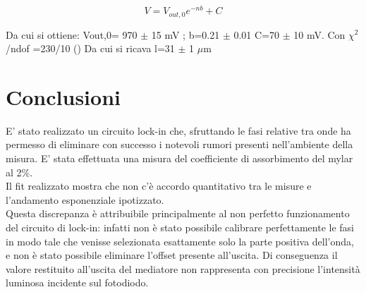 \begin{equation}
V=V_{out,0}e^{-nb} + C
\end{equation}

Da cui si ottiene:
V{out,0}= 970 $\pm$ 15 mV ;  b=0.21 $\pm$ 0.01  C=70 $\pm$ 10 mV. Con $\chi^{2}$/ndof =230/10 ()
Da cui si ricava l=31 $\pm$  1 $\mu$m
\section{Conclusioni}
E' stato realizzato un circuito lock-in che, sfruttando le fasi relative tra onde ha permesso di eliminare con successo i notevoli rumori presenti nell'ambiente della misura. E' stata effettuata una misura del coefficiente di assorbimento del mylar al 2\%. \\
Il fit realizzato mostra che non c'è accordo quantitativo tra le misure e l'andamento esponenziale ipotizzato.\\
Questa discrepanza è attribuibile principalmente al non perfetto funzionamento del circuito di lock-in: infatti non è stato possibile calibrare perfettamente le fasi in modo tale che venisse selezionata esattamente solo la parte positiva dell'onda, e non è stato possibile eliminare l'offset presente all'uscita. Di conseguenza il valore restituito all'uscita del mediatore non rappresenta con precisione l'intensità luminosa incidente sul fotodiodo.\\
